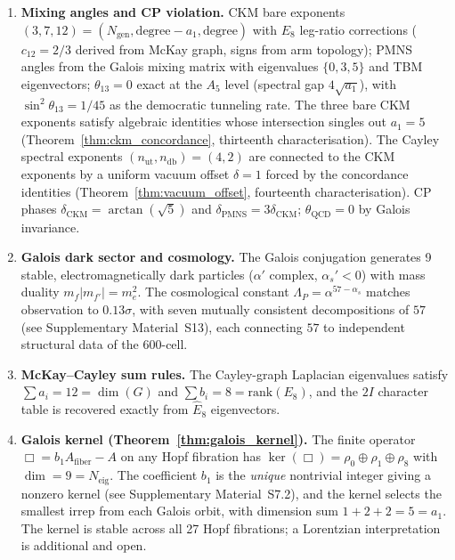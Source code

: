 \documentclass[12pt,a4paper]{article}
\theoremstyle{definition}
\begin{document}
\begin{enumerate}
\item \textbf{Mixing angles and CP violation.}  CKM bare exponents $(3,7,12) = (N_{\text{gen}}, \text{degree}-a_1, \text{degree})$ with $E_8$ leg-ratio corrections ($c_{12} = 2/3$ derived from McKay graph, signs from arm topology); PMNS angles from the Galois mixing matrix with eigenvalues $\{0, 3, 5\}$ and TBM eigenvectors; $\theta_{13} = 0$ exact at the $A_5$ level (spectral gap $4\sqrt{a_1}$), with $\sin^2\theta_{13} = 1/45$ as the democratic tunneling rate.  The three bare CKM exponents satisfy algebraic identities whose intersection singles out $a_1 = 5$ (Theorem~\ref{thm:ckm_concordance}, thirteenth characterisation).  The Cayley spectral exponents $(n_{\text{ut}}, n_{\text{db}}) = (4, 2)$ are connected to the CKM exponents by a uniform vacuum offset $\delta = 1$ forced by the concordance identities (Theorem~\ref{thm:vacuum_offset}, fourteenth characterisation).  CP phases $\delta_{\text{CKM}} = \arctan(\sqrt{5})$ and $\delta_{\text{PMNS}} = 3\delta_{\text{CKM}}$; $\theta_{\text{QCD}} = 0$ by Galois invariance.

\item \textbf{Galois dark sector and cosmology.}  The Galois conjugation generates 9 stable, electromagnetically dark particles ($\alpha'$ complex, $\alpha_s' < 0$) with mass duality $m_f |m_{f'}| = m_e^2$.  The cosmological constant $\Lambda_P = \alpha^{57-\alpha_s}$ matches observation to $0.13\sigma$, with seven mutually consistent decompositions of $57$ (see Supplementary Material~S13), each connecting $57$ to independent structural data of the 600-cell.

\item \textbf{McKay--Cayley sum rules.}  The Cayley-graph Laplacian eigenvalues satisfy $\sum a_i = 12 = \dim(G)$ and $\sum b_i = 8 = \text{rank}(E_8)$, and the $2I$ character table is recovered exactly from $\hat{E}_8$ eigenvectors.

\item \textbf{Galois kernel (Theorem~\ref{thm:galois_kernel}).}  The finite operator $\Box = b_1 A_{\text{fiber}} - A$ on any Hopf fibration has $\ker(\Box) = \rho_0 \oplus \rho_1 \oplus \rho_8$ with $\dim = 9 = N_{\text{eig}}$.  The coefficient $b_1$ is the \emph{unique} nontrivial integer giving a nonzero kernel (see Supplementary Material~S7.2), and the kernel selects the smallest irrep from each Galois orbit, with dimension sum $1 + 2 + 2 = 5 = a_1$.  The kernel is stable across all 27 Hopf fibrations; a Lorentzian interpretation is additional and open.
\end{enumerate}
\end{document}

